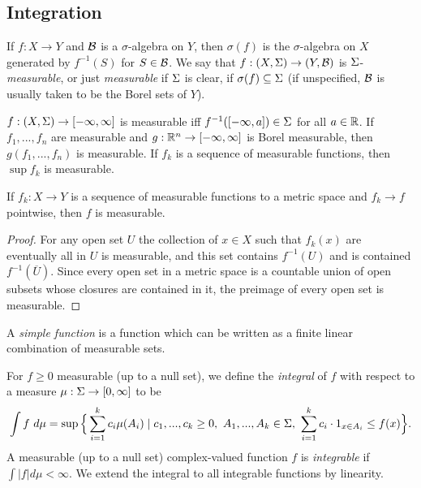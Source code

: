 \documentclass[letterpaper,11pt]{report}
\begin{document}
\subsection{Integration}

\begin{defn} If $f:X\rightarrow Y$ and $\mathcal{B}$ is a $\sigma$-algebra on $Y$, then $\sigma(f)$ is the $\sigma$-algebra on $X$ generated by $f^{-1}(S)$ for $S \in \mathcal{B}$. We say that $f:(X,\Sigma) \rightarrow (Y,\mathcal{B})$ is $\Sigma$-\emph{measurable}, or just \emph{measurable} if $\Sigma$ is clear, if $\sigma(f) \subseteq \Sigma$ (if unspecified, $\mathcal{B}$ is usually taken to be the Borel sets of $Y$).
\end{defn}

\begin{prop} $f:(X,\Sigma) \rightarrow [-\infty,\infty]$ is measurable iff $f^{-1}([-\infty,a]) \in \Sigma$ for all $a \in \mathbb{R}$. If $f_1, ..., f_n$ are measurable and $g:\mathbb{R}^n \rightarrow [-\infty,\infty]$ is Borel measurable, then $g(f_1, ..., f_n)$ is measurable. If $f_k$ is a sequence of measurable functions, then $\sup f_k$ is measurable.
\end{prop}

\begin{prop} If $f_k : X \rightarrow Y$ is a sequence of measurable functions to a metric space and $f_k \rightarrow f$ pointwise, then $f$ is measurable.
\end{prop}
\begin{proof} For any open set $U$ the collection of $x \in X$ such that $f_k(x)$ are eventually all in $U$ is measurable, and this set contains $f^{-1}(U)$ and is contained $f^{-1}(\overline{U})$. Since every open set in a metric space is a countable union of open subsets whose closures are contained in it, the preimage of every open set is measurable.
\end{proof}

\begin{defn} A \emph{simple function} is a function which can be written as a finite linear combination of measurable sets.
\end{defn}

\begin{defn} For $f \ge 0$ measurable (up to a null set), we define the \emph{integral} of $f$ with respect to a measure $\mu:\Sigma\rightarrow [0,\infty]$ to be
\[
\int f\ d\mu = \sup\Big\{\sum_{i = 1}^k c_i\mu(A_i) \mid c_1, ..., c_k \ge 0,\ A_1, ..., A_k \in \Sigma,\ \sum_{i=1}^k c_i\cdot 1_{x \in A_i} \le f(x)\Big\}.
\]
A measurable (up to a null set) complex-valued function $f$ is \emph{integrable} if $\int |f| d\mu < \infty$. We extend the integral to all integrable functions by linearity.
\end{defn}
\end{document}
